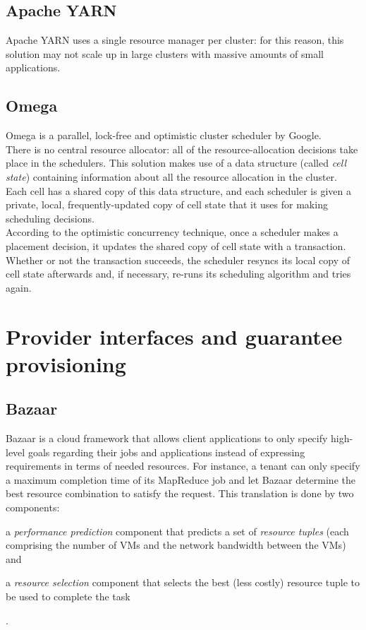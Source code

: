 \documentclass[a4paper, 11pt]{article}
\begin{document}
\subsection{Apache YARN \cite{yarn}}
Apache YARN \cite{yarn} uses a single resource manager per cluster: for this reason, this solution may not scale up in large clusters with massive amounts of small applications. 
\subsection{Omega \cite{omega}}
Omega \cite{omega} is a parallel, lock-free and optimistic cluster scheduler by Google.\\
There is no central resource allocator: all of the resource-allocation decisions take place in the schedulers. This solution makes use of a data structure (called \textit{cell state}) containing information about all the resource allocation in the cluster. Each cell has a shared copy of this data structure, and each scheduler is given a private, local, frequently-updated copy of cell state that it uses for making scheduling decisions.\\
According to the optimistic concurrency technique, once a scheduler makes a placement decision, it updates the shared copy of cell state with a transaction. Whether or not the transaction succeeds, the scheduler resyncs its local copy of cell state afterwards and, if necessary, re-runs its scheduling algorithm and tries again.

\section{Provider interfaces and guarantee provisioning}
\subsection{Bazaar \cite{bazaar}}
Bazaar \cite{bazaar} is a cloud framework that allows client applications to only specify high-level goals regarding their jobs and applications instead of expressing requirements in terms of needed resources. For instance, a tenant can only specify a maximum completion time of its MapReduce \cite{mapreduce} job and let Bazaar \cite{bazaar} determine the best resource combination to satisfy the request. This translation is done by two components:
\begin{mylist}
    \item a \textit{performance prediction} component that predicts a set of \textit{resource tuples} (each comprising the number of VMs and the network bandwidth between the VMs) and
    \item a \textit{resource selection} component that selects the best (less costly) resource tuple to be used to complete the task
\end{mylist}.\\
\end{document}
